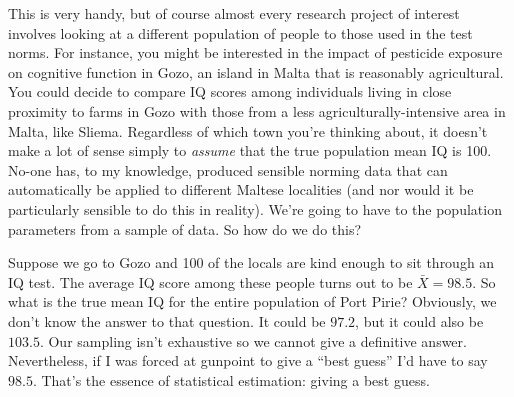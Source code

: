 This is very handy, but of course almost every research project of interest involves looking at a different population of people to those used in the test norms. For instance, you might be interested in the impact of pesticide exposure on cognitive function in Gozo, an island in Malta that is reasonably agricultural. You could decide to compare IQ scores among individuals living in close proximity to farms in Gozo with those from a less agriculturally-intensive area in Malta, like Sliema. Regardless of which town you're thinking about, it doesn't make a lot of sense simply to {\it assume} that the true population mean IQ is 100. No-one has, to my knowledge, produced sensible norming data that can automatically be applied to different Maltese localities (and nor would it be particularly sensible to do this in reality). We're going to have to  the population parameters from a sample of data. So how do we do this?



Suppose we go to Gozo and 100 of the locals are kind enough to sit through an IQ test. The average IQ score among these people turns out to be $\bar{X}=98.5$. So what is the true mean IQ for the entire population of Port Pirie? Obviously, we don't know the answer to that question. It could be $97.2$, but it could also be $103.5$. Our sampling isn't exhaustive so we cannot give a definitive answer. Nevertheless, if I was forced at gunpoint to give a ``best guess'' I'd have to say $98.5$. That's the essence of statistical estimation: giving a best guess. 

